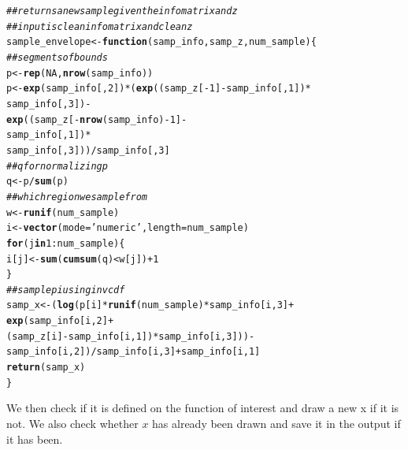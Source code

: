 \documentclass{article}\usepackage[]{graphicx}\usepackage[]{color}
\makeatletter
\newcommand{\hlnum}[1]{\textcolor[rgb]{0.686,0.059,0.569}{#1}}%
\newcommand{\hlstr}[1]{\textcolor[rgb]{0.192,0.494,0.8}{#1}}%
\newcommand{\hlcom}[1]{\textcolor[rgb]{0.678,0.584,0.686}{\textit{#1}}}%
\newcommand{\hlopt}[1]{\textcolor[rgb]{0,0,0}{#1}}%
\newcommand{\hlstd}[1]{\textcolor[rgb]{0.345,0.345,0.345}{#1}}%
\newcommand{\hlkwa}[1]{\textcolor[rgb]{0.161,0.373,0.58}{\textbf{#1}}}%
\newcommand{\hlkwb}[1]{\textcolor[rgb]{0.69,0.353,0.396}{#1}}%
\newcommand{\hlkwc}[1]{\textcolor[rgb]{0.333,0.667,0.333}{#1}}%
\newcommand{\hlkwd}[1]{\textcolor[rgb]{0.737,0.353,0.396}{\textbf{#1}}}%
\newenvironment{kframe}{%
 \def\at@end@of@kframe{}%
 \ifinner\ifhmode%
  \def\at@end@of@kframe{\end{minipage}}%
  \begin{minipage}{\columnwidth}%
 \fi\fi%
 \def\FrameCommand##1{\hskip\@totalleftmargin \hskip-\fboxsep
 \colorbox{shadecolor}{##1}\hskip-\fboxsep
     \hskip-\linewidth \hskip-\@totalleftmargin \hskip\columnwidth}%
 \MakeFramed {\advance\hsize-\width
   \@totalleftmargin\z@ \linewidth\hsize
   \@setminipage}}%
 {\par\unskip\endMakeFramed%
 \at@end@of@kframe}
\newenvironment{knitrout}{}{} %
\makeatother
\begin{document}
\begin{knitrout}
\color{fgcolor}\begin{kframe}
\begin{alltt}
\hlcom{## returns a new sample given the info matrix and z}
\hlcom{## input is clean info matrix and clean z}
\hlstd{sample_envelope} \hlkwb{<-} \hlkwa{function}\hlstd{(}\hlkwc{samp_info}\hlstd{,} \hlkwc{samp_z}\hlstd{,} \hlkwc{num_sample}\hlstd{)\{}
  \hlcom{## segments of bounds}
  \hlstd{p} \hlkwb{<-} \hlkwd{rep}\hlstd{(}\hlnum{NA}\hlstd{,} \hlkwd{nrow}\hlstd{(samp_info))}
  \hlstd{p} \hlkwb{<-} \hlkwd{exp}\hlstd{(samp_info[,}\hlnum{2}\hlstd{])}\hlopt{*}\hlstd{(}\hlkwd{exp}\hlstd{((samp_z[}\hlopt{-}\hlnum{1}\hlstd{]} \hlopt{-} \hlstd{samp_info[,}\hlnum{1}\hlstd{])}\hlopt{*}
                               \hlstd{samp_info[,}\hlnum{3}\hlstd{])} \hlopt{-}
                           \hlkwd{exp}\hlstd{((samp_z[}\hlopt{-}\hlkwd{nrow}\hlstd{(samp_info)} \hlopt{-} \hlnum{1}\hlstd{]} \hlopt{-}
                                \hlstd{samp_info[,}\hlnum{1}\hlstd{])}\hlopt{*}
                               \hlstd{samp_info[,}\hlnum{3}\hlstd{]))}\hlopt{/}\hlstd{samp_info[,}\hlnum{3}\hlstd{]}
  \hlcom{## q for normalizing p}
  \hlstd{q} \hlkwb{<-} \hlstd{p}\hlopt{/}\hlkwd{sum}\hlstd{(p)}
  \hlcom{## which region we sample from}
  \hlstd{w} \hlkwb{<-} \hlkwd{runif}\hlstd{(num_sample)}
  \hlstd{i} \hlkwb{<-} \hlkwd{vector}\hlstd{(}\hlkwc{mode} \hlstd{=} \hlstr{'numeric'}\hlstd{,} \hlkwc{length} \hlstd{= num_sample)}
  \hlkwa{for} \hlstd{(j} \hlkwa{in} \hlnum{1}\hlopt{:}\hlstd{num_sample)\{}
    \hlstd{i[j]} \hlkwb{<-} \hlkwd{sum}\hlstd{(}\hlkwd{cumsum}\hlstd{(q)} \hlopt{<} \hlstd{w[j])} \hlopt{+} \hlnum{1}
  \hlstd{\}}
  \hlcom{## sample pi using inv cdf}
  \hlstd{samp_x} \hlkwb{<-} \hlstd{(}\hlkwd{log}\hlstd{(p[i]}\hlopt{*}\hlkwd{runif}\hlstd{(num_sample)}\hlopt{*}\hlstd{samp_info[i,} \hlnum{3}\hlstd{]} \hlopt{+}
                   \hlkwd{exp}\hlstd{(samp_info[i,}\hlnum{2}\hlstd{]} \hlopt{+}
                         \hlstd{(samp_z[i]} \hlopt{-} \hlstd{samp_info[i,}\hlnum{1}\hlstd{])}\hlopt{*}\hlstd{samp_info[i,}\hlnum{3}\hlstd{]))} \hlopt{-}
               \hlstd{samp_info[i,}\hlnum{2}\hlstd{])}\hlopt{/}\hlstd{samp_info[i,}\hlnum{3}\hlstd{]} \hlopt{+} \hlstd{samp_info[i,}\hlnum{1}\hlstd{]}
  \hlkwd{return}\hlstd{(samp_x)}
\hlstd{\}}
\end{alltt}
\end{kframe}
\end{knitrout}

We then check if it is defined on the function of interest and draw a
new x if it is not. We also check whether $x$ has already been drawn
and save it in the output if it has been.
\end{document}
